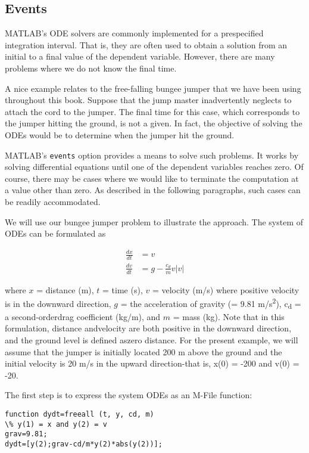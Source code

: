 \documentclass[../main.tex]{subfiles}
\begin{document}
\subsection{Events}
MATLAB's ODE solvers are commonly implemented for a prespecified integration interval. That is, they are often used to obtain a solution from an initial to a final value of the dependent variable. However, there are many problems where we do not know the final time.

A nice example relates to the free-falling bungee jumper that we have been using
throughout this book. Suppose that the jump master inadvertently neglects to attach the cord to the jumper. The final time for this case, which corresponds to the jumper hitting the ground, is not a given. In fact, the objective of solving the ODEs would be to determine when the jumper hit the ground.

MATLAB's \texttt{events} option provides a means to solve such problems. It works by
solving differential equations until one of the dependent variables reaches zero. Of course, there may be cases where we would like to terminate the computation at a value other than zero. As described in the following paragraphs, such cases can be readily accommodated.

We will use our bungee jumper problem to illustrate the approach. The system of
ODEs can be formulated as

\begin{equation}
    \begin{aligned}
    \frac{d x}{d t} &=v \\
    \frac{d v}{d t} &=g-\frac{c_{d}}{m} v|v| \nonumber
    \end{aligned}
\end{equation}


\noindent where $x$ = distance (m), $t$ = time (s), $v$ = velocity (m/s) where positive velocity is in the downward direction, $g$ = the acceleration of gravity (= 9.81 m/s\textsuperscript{2}), c\textsubscript{d} = a second-orderdrag coefficient (kg/m), and $m$ = mass (kg).
Note that in this formulation, distance andvelocity are both positive in the downward direction, and the ground level is defined aszero distance. For the present example, we will assume that the jumper is initially located 200 m above the ground and the initial velocity is 20 m/s in the upward direction-that is, x(0) = -200 and v(0) = -20.

The first step is to express the system ODEs as an M-File function:
\begin{lstlisting}
function dydt=freeall (t, y, cd, m)
\% y(1) = x and y(2) = v
grav=9.81;
dydt=[y(2);grav-cd/m*y(2)*abs(y(2))];
\end{lstlisting}
\end{document}
